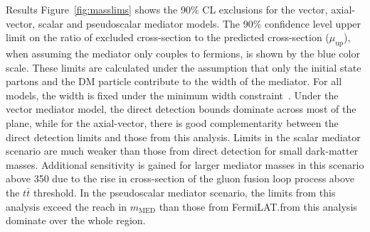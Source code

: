 \begin{section}{Results}
Figure~\ref{fig:masslims} shows the 90\% CL exclusions for the vector, axial-vector, 
scalar and pseudoscalar mediator models.  The 90\% confidence level upper limit on the ratio of excluded cross-section to the predicted cross-section ($\mu_{\textrm{up}}$), 
when assuming the mediator only couples to fermions, is shown by the blue color scale. These limits are calculated under the assumption 
that only the initial state partons and the DM 
particle contribute to the width of the mediator. For all models, the width is fixed under the minimum width constraint~\cite{An:2012va,Abercrombie:2015wmb,Fox:2011pm,simplified1}. 
%
Under the vector mediator model, the direct detection bounds dominate across most of the plane, while for the axial-vector, there is good complementarity between the direct detection limits and 
those from this analysis. Limits in the scalar mediator scenario are much weaker than those from direct detection for small dark-matter masses. Additional sensitivity is gained
for larger mediator masses in this scenario above 350 \GeV due to the rise in cross-section of the gluon fusion loop process above the $t\bar{t}$ threshold. 
In the pseudoscalar mediator scenario, the limits from this analysis exceed the reach in $m_{\mathrm{MED}}$ than those from FermiLAT.from this analysis dominate over the whole region. 


\end{section}
